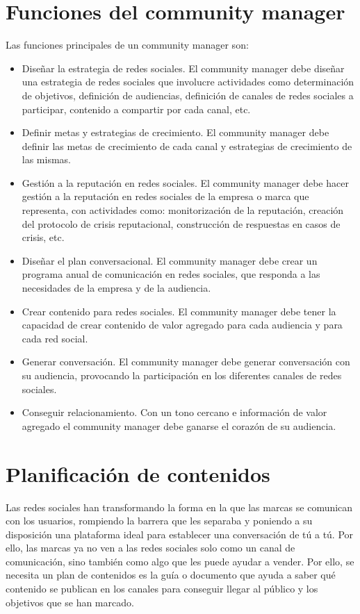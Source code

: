 \section{Funciones del community manager}

Las funciones principales de un community manager son:
\begin{itemize}
    \item Diseñar la estrategia de redes sociales. El community manager debe diseñar una estrategia de redes sociales que involucre actividades como determinación de objetivos, definición de audiencias, definición de canales de redes sociales a participar, contenido a compartir por cada canal, etc.
    \item Definir metas y estrategias de crecimiento. El community manager debe definir las metas de crecimiento de cada canal y estrategias de crecimiento de las mismas.
    \item Gestión a la reputación en redes sociales. El community manager debe hacer gestión a la reputación en redes sociales de la empresa o marca que representa, con actividades como: monitorización de la reputación, creación del protocolo de crisis reputacional, construcción de respuestas en casos de crisis, etc.
    \item Diseñar el plan conversacional. El community manager debe crear un programa anual de comunicación en redes sociales, que responda a las necesidades de la empresa y de la audiencia.
    \item Crear contenido para redes sociales. El community manager debe tener la capacidad de crear contenido de valor agregado para cada audiencia y para cada red social.
    \item Generar conversación. El community manager debe generar conversación con su audiencia, provocando la participación en los diferentes canales de redes sociales.
    \item Conseguir relacionamiento. Con un tono cercano e información de valor agregado el community manager debe ganarse el corazón de su audiencia.
\end{itemize}

\section{Planificación de contenidos}

Las redes sociales han transformando la forma en la que las marcas se comunican con los usuarios, rompiendo la barrera que les separaba y poniendo a su disposición una plataforma ideal para establecer una conversación de tú a tú. Por ello, las marcas ya no ven a las redes sociales solo como un canal de comunicación, sino también como algo que les puede ayudar a vender. Por ello, se necesita un plan de contenidos es la guía o documento que ayuda a saber qué contenido se publican en los canales para conseguir llegar al público y los objetivos que se han marcado. 

